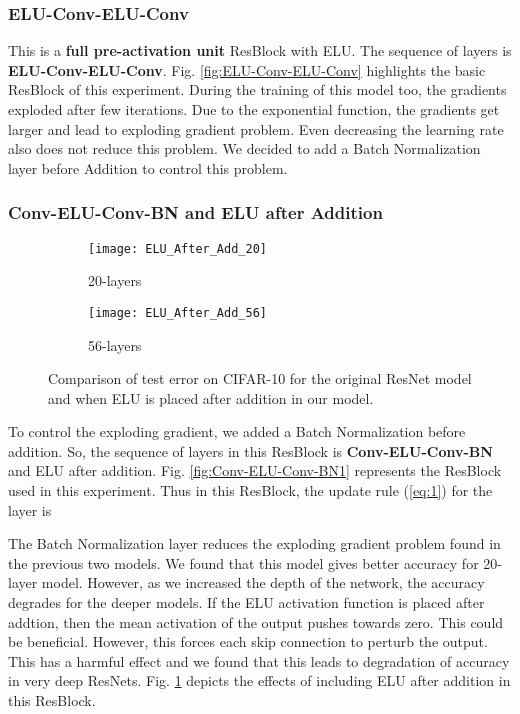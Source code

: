 \documentclass[10pt,twocolumn,letterpaper]{article}
\begin{document}
\subsubsection{ELU-Conv-ELU-Conv}

This is a \textbf{full pre-activation unit} ResBlock \cite{[32]} with ELU. The sequence of layers is \textbf{ELU-Conv-ELU-Conv}. Fig. \ref{fig:ELU-Conv-ELU-Conv} highlights the basic ResBlock of this experiment. During the training of this model too, the gradients exploded after few iterations. Due to the exponential function, the gradients get larger and lead to exploding gradient problem. Even decreasing the learning rate also does not reduce this problem. We decided to add a Batch Normalization layer before Addition to control this problem.

\subsubsection{Conv-ELU-Conv-BN and ELU after Addition}

\begin{figure}
    \centering
    \begin{subfigure}{.23\textwidth}
        \centering
        \texttt{[image: ELU\_After\_Add\_20]}
        \caption{20-layers}
    \end{subfigure}
    \begin{subfigure}{.23\textwidth}
        \centering
        \texttt{[image: ELU\_After\_Add\_56]}
        \caption{56-layers}
    \end{subfigure}
    \caption{Comparison of test error on CIFAR-10 for the original ResNet model and when ELU is placed after addition in our model.}
    \label{fig:ELU_After_Add}
\end{figure}

To control the exploding gradient, we added a Batch Normalization before addition. So, the sequence of layers in this ResBlock is \textbf{Conv-ELU-Conv-BN} and ELU after addition. Fig. \ref{fig:Conv-ELU-Conv-BN1} represents the ResBlock used in this experiment. Thus in this ResBlock, the update rule (\ref{eq:1}) for the  layer is 



The Batch Normalization layer reduces the exploding gradient problem found in the previous two models. We found that this model gives better accuracy for 20-layer model. However, as we increased the depth of the network, the accuracy degrades for the deeper models. If the ELU activation function is placed after addtion, then the mean activation of the output pushes towards zero. This could be beneficial. However, this forces each skip connection to perturb the output. This has a harmful effect and we found that this leads to degradation of accuracy in very deep ResNets. Fig. \ref{fig:ELU_After_Add} depicts the effects of including ELU after addition in this ResBlock.
\end{document}
